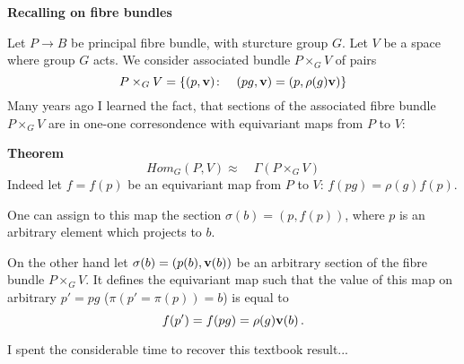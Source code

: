 

\baselineskip=14pt

\def\A {{\bf A}} 
\def\B {{\cal B}}
\def\C {{\bf C}}
\def\CC {{\cal C}}
\def\Cl {{\tt \hbox{Cliff}}}
\def\E {{\bf E}}
\def\EE {{\cal E}}
\def\F {{\cal F}}
\def\FF {{\cal F}}
\def\G {\Gamma}
\def\GG {{\cal G}}
\def\H {{\bf H}}
\def\K {{\bf K}}
\def\L {{\cal L}}
\def\M {{\cal M}}
\def\N {{\bf N}}
\def\R {{\bf R}}
\def\Sb {{\bf S}}
\def\SS {{\cal S}}
\def\Tr {{\rm Tr\,}}
\def\V {{\cal V}}
\def\X {{\bf X}}
\def\XX {{\cal X}}
\def\Y {{\bf Y}}
\def\Z {{\bf Z}}

\def\a {\alpha}
\def\ac {{\bf a}}
\def\b {{\bf b}}
\def\bs {{\bf s}}
\def\c {{\bf c}}
\def\d {\delta}
\def\dist {{\tt \hbox{distance}}}
\def\e {{\bf e}}
\def\f {{\bf f}}
\def\finish {\blacksquare}
\def\g {{\bf g}}
\def\grad {{\rm grad\,}}
\def\h {\hbar}
\def\k {{\bf k}}
\def\l {{\bf l}}
\def\m {{\bf m}}
\def\n {{\bf n}}
\def\p {\partial}
\def\pb {{\bf p}}
\def\pt {{\bf pt}}
\def\q {{\bf q}}
\def\r {{\bf r}}
\def\s {\sigma}
\def\t {{\bf t}}
\def\tS {{\tilde \Sigma}}
\def\td {\tilde}
\def\v {{\bf v}}
\def\vare {\varepsilon}
\def\x {{\bf x}}
\def\y {{\bf y}}
\def\w {\omega}


\centerline{\bf Recalling on fibre bundles}

Let $P\to B$ be principal fibre bundle, with sturcture
group $G$. Let $V$ be a space where group $G$ acts.
 We consider associated bundle $P\times_G V$
of pairs
          $$
   P\times_G V=\{(p,\v)\colon\quad 
    (pg,\v)=(p,\rho(g)\v)\}
          $$
Many years ago I learned the fact, that  sections
of the associated fibre bundle $P\times_G V$ are in
one-one corresondence with equivariant maps
from $P$ to $V$:

{\bf Theorem}
         $$
Hom_G(P,V)\approx\quad \Gamma \left(P\times_G V\right)
         $$
Indeed let $f=f(p)$  be an equivariant map from $P$ to
$V$:
   $f(pg)=\rho(g)f(p)$.

One can assign to this map the section
$\sigma(b)=(p,f(p))$,
where $p$ is an arbitrary element which projects to $b$.

On the other hand let $\sigma(b)=(p(b),\v(b))$
be an arbitrary section of the fibre bundle  
$P\times_GV$.  It defines the equivariant map
such that the value of this map on arbitrary $p'=pg$
($\pi (p'=\pi (p))=b$) is equal to
         $$
f(p')=f(pg)=\rho (g)\v(b)\,.
         $$


 I spent the considerable time to recover this textbook
result...
\bye
